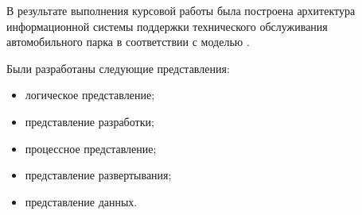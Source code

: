 В результате выполнения курсовой работы была построена архитектура
информационной системы поддержки технического обслуживания автомобильного парка
в соответствии с моделью .

Были разработаны следующие представления:
\begin{itemize}
  \item логическое представление;
  \item представление разработки;
  \item процессное представление;
  \item представление развертывания;
  \item представление данных.
\end{itemize}
